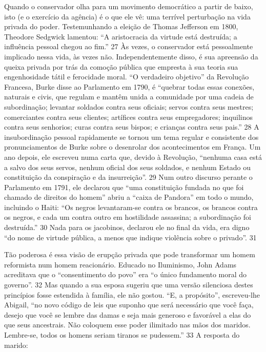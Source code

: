 Quando o conservador olha para um movimento democrático a partir de baixo, isto (e o exercício da agência) é o que ele vê: uma terrível perturbação na vida privada do poder. Testemunhando a eleição de Thomas Jefferson em 1800, Theodore Sedgwick lamentou: “A aristocracia da virtude está destruída; a influência pessoal chegou ao fim.”
 {\color{blue} 27}  
Às vezes, o conservador está pessoalmente implicado nessa vida, às vezes não. Independentemente disso, é sua apreensão da queixa privada por trás da comoção pública que empresta à sua teoria sua engenhosidade tátil e ferocidade moral. “O verdadeiro objetivo” da Revolução Francesa, Burke disse ao Parlamento em 1790, é “quebrar todas essas conexões, naturais e civis, que regulam e mantêm unida a comunidade por uma cadeia de subordinação; levantar soldados contra seus oficiais; servos contra seus mestres; comerciantes contra seus clientes; artífices contra seus empregadores; inquilinos contra seus senhorios; curas contra seus bispos; e crianças contra seus pais.”
 {\color{blue} 28}  
A insubordinação pessoal rapidamente se tornou um tema regular e consistente dos pronunciamentos de Burke sobre o desenrolar dos acontecimentos em França. Um ano depois, ele escreveu numa carta que, devido à Revolução, “nenhuma casa está a salvo dos seus servos, nenhum oficial dos seus soldados, e nenhum Estado ou constituição da conspiração e da insurreição”.
 {\color{blue} 29}  
Num outro discurso perante o Parlamento em 1791, ele declarou que “uma constituição fundada no que foi chamado de direitos do homem” abriu a “caixa de Pandora” em todo o mundo, incluindo o Haiti: “Os negros levantaram-se contra os brancos, os brancos contra os negros, e cada um contra outro em hostilidade assassina; a subordinação foi destruída.”
 {\color{blue} 30}  
Nada para os jacobinos, declarou ele no final da vida, era digno “do nome de virtude pública, a menos que indique violência sobre o privado”.
 {\color{blue} 31}  

 
\par
 
Tão poderosa é essa visão de erupção privada que pode transformar um homem reformista num homem reacionário. Educado no Iluminismo, John Adams acreditava que o “consentimento do povo” era “o único fundamento moral do governo”.
 {\color{blue} 32}  
Mas quando a sua esposa sugeriu que uma versão silenciosa destes princípios fosse estendida à família, ele não gostou. “E, a propósito”, escreveu-lhe Abigail, “no novo código de leis que suponho que será necessário que você faça, desejo que você se lembre das damas e seja mais generoso e favorável a elas do que seus ancestrais. Não coloquem esse poder ilimitado nas mãos dos maridos. Lembre-se, todos os homens seriam tiranos se pudessem.”
 {\color{blue} 33}  
A resposta do marido:
 
